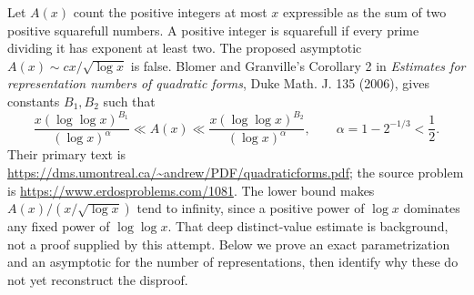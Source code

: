 Let $A(x)$ count the positive integers at most $x$ expressible as the sum of two positive squarefull numbers. A positive integer is squarefull if every prime dividing it has exponent at least two. The proposed asymptotic $A(x)\sim cx/\sqrt{\log x}$ is false. Blomer and Granville's Corollary 2 in \emph{Estimates for representation numbers of quadratic forms}, Duke Math. J. 135 (2006), gives constants $B_1,B_2$ such that
\[
 \frac{x(\log\log x)^{B_1}}{(\log x)^\alpha}\ll A(x)\ll
 \frac{x(\log\log x)^{B_2}}{(\log x)^\alpha},\qquad \alpha=1-2^{-1/3}<\frac12.
\]
Their primary text is \url{https://dms.umontreal.ca/~andrew/PDF/quadraticforms.pdf}; the source problem is \url{https://www.erdosproblems.com/1081}. The lower bound makes $A(x)/(x/\sqrt{\log x})$ tend to infinity, since a positive power of $\log x$ dominates any fixed power of $\log\log x$.
That deep distinct-value estimate is background, not a proof supplied by this attempt. Below we prove an exact parametrization and an asymptotic for the number of representations, then identify why these do not yet reconstruct the disproof.
